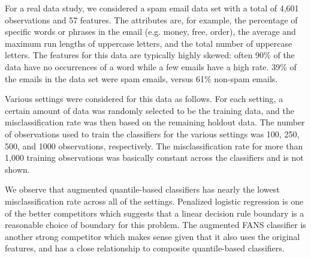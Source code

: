 For a real data study, we considered a spam email data set with a total of 4,601
observations and 57 features.  The attributes are, for example, the percentage
of specific words or phrases in the email (e.g. money, free, order), the average
and maximum run lengths of uppercase letters, and the total number of uppercase
letters.  The features for this data are typically highly skewed: often 90\% of
the data have no occurrences of a word while a few emails have a high rate.
39\% of the emails in the data set were spam emails, versus 61\% non-spam
emails.

Various settings were considered for this data as follows.  For each setting, a
certain amount of data was randomly selected to be the training data, and the
misclassification rate was then based on the remaining holdout data.  The number
of observations used to train the classifiers for the various settings was 100,
250, 500, and 1000 observations, respectively.  The misclassification rate for
more than 1,000 training observations was basically constant across the
classifiers and is not shown.

We observe that augmented quantile-based classifiers has nearly the lowest
misclassification rate across all of the settings.  Penalized logistic
regression is one of the better competitors which suggests that a linear
decision rule boundary is a reasonable choice of boundary for this problem.  The
augmented FANS classifier is another strong competitor which makes sense given
that it also uses the original features, and has a close relationship to
composite quantile-based classifiers.





